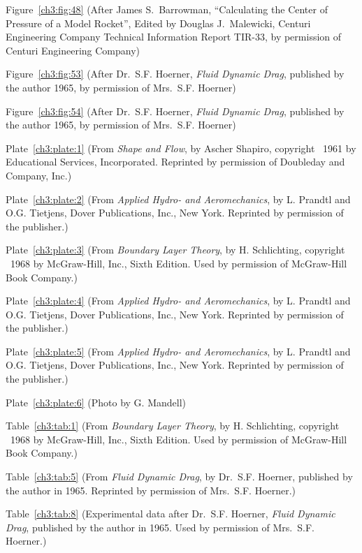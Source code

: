 Figure~\ref{ch3:fig:48} (After James S.~Barrowman, ``Calculating the Center of
Pressure of a Model Rocket'', Edited by Douglas J.~Malewicki,
Centuri Engineering Company Technical Information Report TIR-33,
by permission of Centuri Engineering Company)

Figure~\ref{ch3:fig:53} (After Dr.~S.F. Hoerner, \emph{Fluid Dynamic Drag}, published
by the author 1965, by permission of Mrs.~S.F. Hoerner)

Figure~\ref{ch3:fig:54} (After Dr.~S.F. Hoerner, \emph{Fluid Dynamic Drag}, published
by the author 1965, by permission of Mrs.~S.F. Hoerner)

Plate~\ref{ch3:plate:1} (From \emph{Shape and Flow}, by Ascher Shapiro, copyright \textcopyright~1961
by Educational Services, Incorporated. Reprinted by permission
of Doubleday and Company, Inc.)

Plate~\ref{ch3:plate:2} (From \emph{Applied Hydro- and Aeromechanics}, by L. Prandtl and
O.G. Tietjens, Dover Publications, Inc., New York. Reprinted by
permission of the publisher.)

Plate~\ref{ch3:plate:3} (From \emph{Boundary Layer Theory}, by H. Schlichting, copyright
\textcopyright~1968 by McGraw-Hill, Inc., Sixth Edition. Used by permission
of McGraw-Hill Book Company.)

Plate~\ref{ch3:plate:4} (From \emph{Applied Hydro- and Aeromechanics}, by L. Prandtl and
O.G. Tietjens, Dover Publications, Inc., New York. Reprinted by
permission of the publisher.)

Plate~\ref{ch3:plate:5} (From \emph{Applied Hydro- and Aeromechanics}, by L. Prandtl and
O.G. Tietjens, Dover Publications, Inc., New York. Reprinted by
permission of the publisher.)

Plate~\ref{ch3:plate:6} (Photo by G. Mandell)

Table~\ref{ch3:tab:1} (From \emph{Boundary Layer Theory}, by H. Schlichting, copyright
\textcopyright~1968 by McGraw-Hill, Inc., Sixth Edition. Used by permission
of McGraw-Hill Book Company.)

Table~\ref{ch3:tab:5} (From \emph{Fluid Dynamic Drag}, by Dr.~S.F. Hoerner, published by
the author in 1965. Reprinted by permission of Mrs.~S.F. Hoerner.)

Table~\ref{ch3:tab:8} (Experimental data after Dr.~S.F. Hoerner, \emph{Fluid Dynamic
Drag}, published by the author in 1965. Used by permission of
Mrs.~S.F. Hoerner.)

\endgroup

